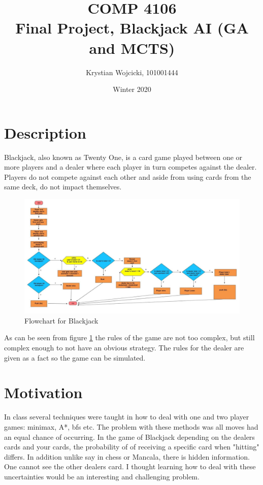 \documentclass{article}
\title{COMP 4106\\
	\large{Final Project, Blackjack AI (GA and MCTS)}}
\author{Krystian Wojcicki, 101001444}
\date{Winter 2020}
\begin{document}
\maketitle

\section{Description}
Blackjack, also known as Twenty One, is a card game played between one or more players and a dealer where each player in turn competes against the dealer. Players do not compete against each other and aside from using cards from the same deck, do not impact themselves. 

\begin{figure}[H]
\centerline{\includegraphics[scale=0.55]{flowchart}}
\caption{Flowchart for Blackjack}
\label{fig:blackjack}
\end{figure}

As can be seen from figure \ref{fig:blackjack} the rules of the game are not too complex, but still complex enough to not have an obvious strategy. The rules for the dealer are given as a fact so the game can be simulated. 

\section{Motivation}
In class several techniques were taught in how to deal with one and two player games: minimax, A*, bfs etc. The problem with these methods was all moves had an equal chance of occurring. In the game of Blackjack depending on the dealers cards and your cards, the probability of of receiving a specific card when "hitting" differs. In addition unlike say in chess or Mancala, there is hidden information. One cannot see the other dealers card. I thought learning how to deal with these uncertainties would be an interesting and challenging problem. 
\end{document}
